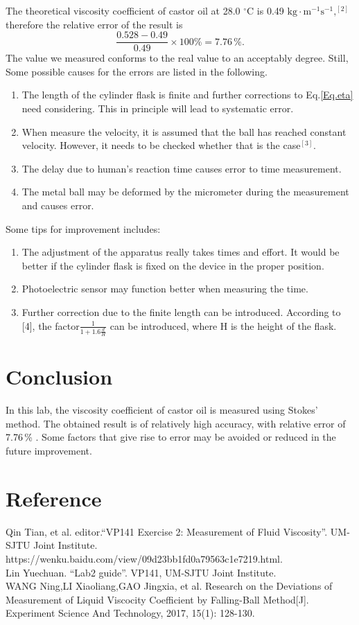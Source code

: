 \documentclass[a4paper]{article}
\begin{document}
The theoretical viscosity coefficient of castor oil at 28.0 $^\circ$C is 0.49 $\text{kg}\cdot\text{m}^{-1}\text{s}^{-1},^{[2]}$ therefore the relative error of the result is
$$\frac{0.528-0.49}{0.49}\times100\%= 7.76\,\%.$$
The value we measured conforms to the real value to an acceptably degree. Still, Some possible causes for the errors are listed in the following.

\begin{enumerate}
\item The length of the cylinder flask is finite and further corrections to Eq.\eqref{Eq.eta} need considering. This in principle will lead to systematic error.
\item When measure the velocity, it is assumed that the ball has reached constant velocity. However, it needs to be checked whether that is the case$^{[3]}$.
\item The delay due to human's reaction time causes error to time measurement.
\item The metal ball may be deformed by the micrometer during the measurement and causes error.

\end{enumerate}

Some tips for improvement includes:
\begin{enumerate}
\item The adjustment of the apparatus really takes times and effort. It would be better if the cylinder flask is fixed on the device in the proper position.
\item Photoelectric sensor may function better when measuring the time.
\item Further correction due to the finite length can be introduced. According to [4], the factor$\frac{1}{1+1.6\frac{d}{H}}$ can be introduced, where H is the height of the flask.
\end{enumerate}

		\section{Conclusion}
In this lab, the viscosity coefficient of castor oil is measured using Stokes' method. The obtained result is of relatively high accuracy, with relative error of 7.76\,\%	. Some factors that give rise to error may be avoided or reduced in the future improvement.
		
		
		
		\section{Reference}
\noindent [1] Qin Tian, et al. editor.``VP141 Exercise 2: Measurement of Fluid Viscosity''. UM-SJTU Joint Institute. \\
\noindent [2] https://wenku.baidu.com/view/09d23bb1fd0a79563c1e7219.html.\\
\noindent [3] Lin Yuechuan. ``Lab2 guide''. VP141, UM-SJTU Joint Institute. \\
\noindent [4] WANG Ning,LI Xiaoliang,GAO Jingxia, et al. Research on the Deviations of Measurement of Liquid Viscocity Coefficient by Falling-Ball Method[J]. Experiment Science And Technology, 2017, 15(1): 128-130.
\end{document}

